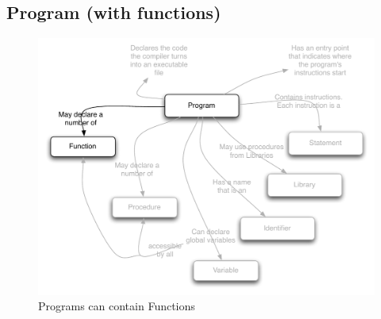 \clearpage
\subsection{Program (with functions)} %
\label{sub:program_with_functions_}

\begin{figure}[h]
\includegraphics[width=\textwidth]{topics/function-decl/diagrams/ProgramWithFunctions} 
 \caption{Programs can contain Functions}
 \label{fig:function-decl-programs}
\end{figure}


